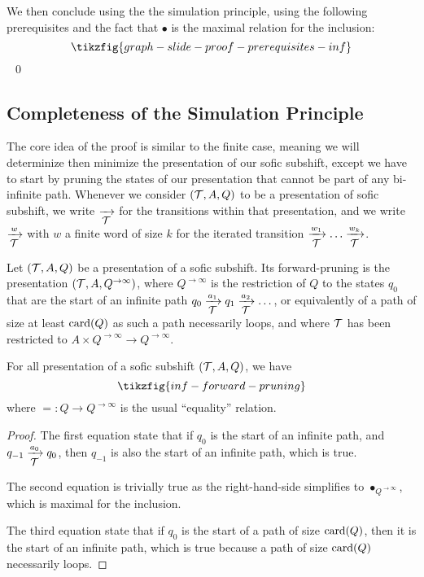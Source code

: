 We then conclude using the the simulation principle, using the following prerequisites and the fact that $\bullet$ is the maximal relation for the inclusion:
\[\tikzfig{graph-slide-proof-prerequisites-inf}\]
~\qed




\subsection{Completeness of the Simulation Principle}\label{app:inf-completeness}

The core idea of the proof is similar to the finite case, meaning we will determinize then minimize the presentation of our sofic subshift, except we have to start by pruning the states of our presentation that cannot be part of any bi-infinite path. Whenever we consider $({\mathcal{T}},A,Q)$ to be a presentation of sofic subshift, we write $\xrightarrow[\text{\small ${\mathcal{T}}$}]{}$ for the transitions within that presentation, and we write $\xrightarrow[\text{\small ${\mathcal{T}}$}]{w}$ with $w$ a finite word of size $k$ for the iterated transition $\xrightarrow[\text{\small ${\mathcal{T}}$}]{w_1} \dots \xrightarrow[\text{\small ${\mathcal{T}}$}]{w_k}$.

\begin{definition}
	Let $({\mathcal{T}},A,Q)$ be a presentation of a sofic subshift. Its forward-pruning is the presentation $({\mathcal{T}},A,Q^{\to \infty})$, where $Q^{\to \infty}$ is the restriction of $Q$ to the states $q_0$ that are the start of an infinite path $q_0 \xrightarrow[\text{\small ${\mathcal{T}}$}]{a_1} q_1 \xrightarrow[\text{\small ${\mathcal{T}}$}]{a_2} \dots$, or equivalently of a path of size at least $\textup{card}(Q)$ as such a path necessarily loops, and where ${\mathcal{T}}$ has been restricted to $A \times Q^{\to \infty} \to Q^{\to \infty}$.
\end{definition}

\begin{proposition}\label{prop:forward-pruning-inf}
	For all presentation of a sofic subshift $({\mathcal{T}},A,Q)$, we have
	\[ \tikzfig{inf-forward-pruning}\]
	where $= : Q \to Q^{\to \infty}$ is the usual ``equality'' relation.
\end{proposition}
\begin{proof}
	The first equation state that if $q_0$ is the start of an infinite path, and $q_{-1} \xrightarrow[\text{\small ${\mathcal{T}}$}]{a_{0}} q_0$, then $q_{-1}$ is also the start of an infinite path, which is true.
	
	The second equation is trivially true as the right-hand-side simplifies to $\bullet_{Q^{\to\infty}}$, which is maximal for the inclusion.
	
	The third equation state that if $q_0$ is the start of a path of size $\textup{card}(Q)$, then it is the start of an infinite path, which is true because a path of size $\textup{card}(Q)$ necessarily loops.	
\end{proof}

